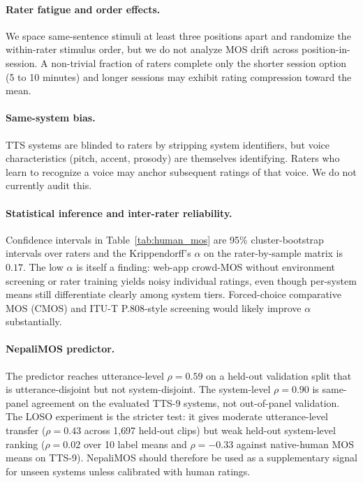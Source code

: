 \documentclass[11pt]{article}
\begin{document}
\paragraph{Rater fatigue and order effects.} We space same-sentence stimuli at least three positions apart and randomize the within-rater stimulus order, but we do not analyze MOS drift across position-in-session. A non-trivial fraction of raters complete only the shorter session option (5 to 10 minutes) and longer sessions may exhibit rating compression toward the mean.

\paragraph{Same-system bias.} TTS systems are blinded to raters by stripping system identifiers, but voice characteristics (pitch, accent, prosody) are themselves identifying. Raters who learn to recognize a voice may anchor subsequent ratings of that voice. We do not currently audit this.

\paragraph{Statistical inference and inter-rater reliability.} Confidence intervals in Table~\ref{tab:human_mos} are 95\% cluster-bootstrap intervals over raters and the Krippendorff's $\alpha$ on the rater-by-sample matrix is $0.17$. The low $\alpha$ is itself a finding: web-app crowd-MOS without environment screening or rater training yields noisy individual ratings, even though per-system means still differentiate clearly among system tiers. Forced-choice comparative MOS (CMOS) and ITU-T P.808-style screening would likely improve $\alpha$ substantially.

\paragraph{NepaliMOS predictor.} The predictor reaches utterance-level $\rho = 0.59$ on a held-out validation split that is utterance-disjoint but not system-disjoint. The system-level $\rho = 0.90$ is same-panel agreement on the evaluated TTS-9 systems, not out-of-panel validation. The LOSO experiment is the stricter test: it gives moderate utterance-level transfer ($\rho = 0.43$ across 1{,}697 held-out clips) but weak held-out system-level ranking ($\rho = 0.02$ over 10 label means and $\rho = -0.33$ against native-human MOS means on TTS-9). NepaliMOS should therefore be used as a supplementary signal for unseen systems unless calibrated with human ratings.
\end{document}

